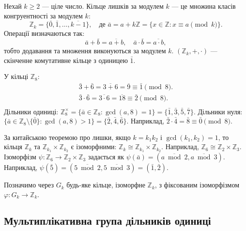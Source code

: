 Нехай \(k\ge2\) — ціле число.
Кільце лишків за модулем \(k\) — це множина класів конгруентності за модулем \(k\):
\[
    \mathbb{Z}_k = \{\bar{0},\bar{1},\dots,\overline{k-1}\}, \quad \text{де } \bar{a} = a + k\mathbb{Z} = \{x\in\mathbb{Z} : x \equiv a \pmod{k}\}.
\]
Операції визначаються так:
\[
    \bar{a} + \bar{b} = \overline{a + b}, \quad \bar{a}\cdot\bar{b} = \overline{a\cdot b},
\]
тобто додавання та множення виконуються за модулем \(k\).
\((\mathbb{Z}_k, +, \cdot)\) — скінченне комутативне кільце з одиницею \(\bar{1}\).

\begin{example}
    \label{ex:z8_ops}
    У кільці \(\mathbb{Z}_8\):
    \begin{gather*}
        \bar{3} + \bar{6} = \overline{3 + 6} = \overline{9} \equiv \bar{1} \pmod{8}.\\
        \bar{3}\cdot\bar{6} = \overline{3 \cdot 6} = \overline{18} \equiv \bar{2} \pmod{8}.\\
    \end{gather*}
    Дільники одиниці: \(\mathbb{Z}_8^\times = \{\bar{a} \in \mathbb{Z}_8 : \gcd(a,8)=1\} = \{\bar{1},\bar{3},\bar{5},\bar{7}\}\).
    Дільники нуля: \(\{\bar{a} \in \mathbb{Z}_8 \setminus \{\bar{0}\} : \gcd(a,8)>1\} = \{\bar{2},\bar{4},\bar{6}\}\).
    Наприклад, \(\bar{2}\cdot\bar{4} = \bar{8} \equiv \bar{0} \pmod{8}\).
\end{example}

\begin{example}
    \label{ex:crt_iso}
    За китайською теоремою про лишки, якщо \(k={k_1k_2}\) і \(\gcd(k_1,k_2)=1\), то кільця \(\mathbb{Z}_k\) та \(\mathbb{Z}_{k_1} \times \mathbb{Z}_{k_2}\) є ізоморфними: \(\mathbb{Z}_k \cong \mathbb{Z}_{k_1} \times \mathbb{Z}_{k_2}\).
    Наприклад, \(\mathbb{Z}_6 \cong \mathbb{Z}_2 \times \mathbb{Z}_3\).
    Ізоморфізм \(\psi: \mathbb{Z}_6 \to \mathbb{Z}_2 \times \mathbb{Z}_3\) задається як \(\psi(\bar{a}) = (\overline{a \bmod 2}, \overline{a \bmod 3})\).
    Наприклад, \(\psi(\bar{5}) = (\overline{5 \bmod 2}, \overline{5 \bmod 3}) = (\bar{1}, \bar{2})\).
\end{example}

Позначимо через \(G_k\) будь-яке кільце, ізоморфне \(\mathbb{Z}_k\), з фіксованим ізоморфізмом \(\varphi: G_k \to \mathbb{Z}_k\).

\subsection{Мультиплікативна група дільників одиниці}
\label{subsec:ring_units_group}

